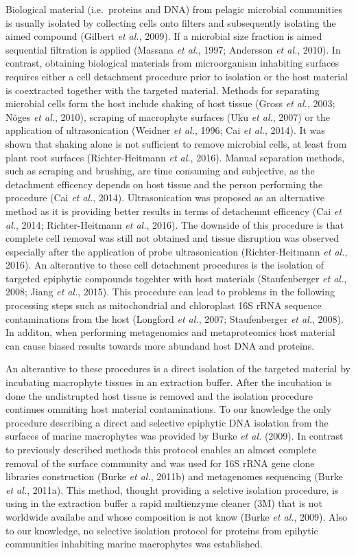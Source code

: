 \documentclass[12pt,]{article}
\begin{document}
Biological material (i.e.~proteins and DNA) from pelagic microbial
communities is usually isolated by collecting cells onto filters and
subsequently isolating the aimed compound (Gilbert \emph{et al.}, 2009).
If a microbial size fraction is aimed sequential filtration is applied
(Massana \emph{et al.}, 1997; Andersson \emph{et al.}, 2010). In
contrast, obtaining biological materials from microorganism inhabiting
surfaces requires either a cell detachment procedure prior to isolation
or the host material is coextracted together with the targeted material.
Methods for separating microbial cells form the host include shaking of
host tissue (Gross \emph{et al.}, 2003; Nõges \emph{et al.}, 2010),
scraping of macrophyte surfaces (Uku \emph{et al.}, 2007) or the
application of ultrasonication (Weidner \emph{et al.}, 1996; Cai
\emph{et al.}, 2014). It was shown that shaking alone is not sufficient
to remove microbial cells, at least from plant root surfaces
(Richter-Heitmann \emph{et al.}, 2016). Manual separation methods, such
as scraping and brushing, are time consuming and subjective, as the
detachment efficency depends on host tissue and the person performing
the procedure (Cai \emph{et al.}, 2014). Ultrasonication was proposed as
an alternative method as it is providing better results in terms of
detachemnt efficency (Cai \emph{et al.}, 2014; Richter-Heitmann \emph{et
al.}, 2016). The downside of this procedure is that complete cell
removal was still not obtained and tissue disruption was observed
especially after the application of probe ultrasonication
(Richter-Heitmann \emph{et al.}, 2016). An alterantive to these cell
detachment procedures is the isolation of targeted epiphytic compounds
togehter with host materials (Staufenberger \emph{et al.}, 2008; Jiang
\emph{et al.}, 2015). This procedure can lead to problems in the
following processing steps such as mitochondrial and chloroplast 16S
rRNA sequence contaminations from the host (Longford \emph{et al.},
2007; Staufenberger \emph{et al.}, 2008). In additon, when performing
metagenomics and metaproteomics host material can cause biased results
towards more abundand host DNA and proteins.

An alterantive to these procedures is a direct isolation of the targeted
material by incubating macrophyte tissues in an extraction buffer. After
the incubation is done the undistrupted host tissue is removed and the
isolation procedure continues ommiting host material contaminations. To
our knowledge the only procedure describing a direct and selective
epiphytic DNA isolation from the surfaces of marine macrophytes was
provided by Burke \emph{et al.} (2009). In contrast to previously
described methods this protocol enables an almost complete removal of
the surface community and was used for 16S rRNA gene clone libraries
construction (Burke \emph{et al.}, 2011b) and metagenomes sequencing
(Burke \emph{et al.}, 2011a). This method, thought providing a selctive
isolation procedure, is using in the extraction buffer a rapid
multienzyme cleaner (3M) that is not worldwide availabe and whose
composition is not know (Burke \emph{et al.}, 2009). Also to our
knowledge, no selective isolation protocol for proteins from epihytic
communities inhabiting marine macrophytes was established.
\end{document}
